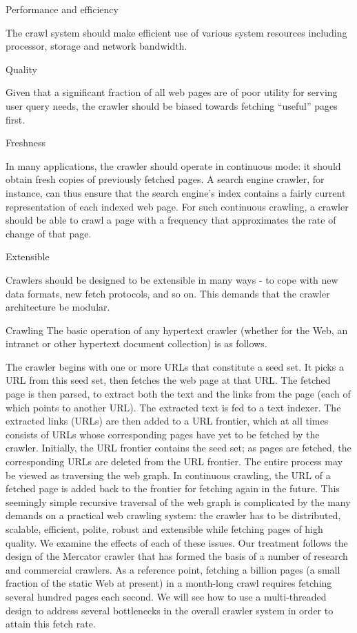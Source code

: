 {Performance and efficiency

The crawl system should make efficient use of various system resources including processor, storage and network bandwidth.

Quality

Given that a significant fraction of all web pages are of poor utility for serving user query needs, the crawler should be biased towards fetching ``useful'' pages first.

Freshness

In many applications, the crawler should operate in continuous mode: it should obtain fresh copies of previously fetched pages. A search engine crawler, for instance, can thus ensure that the search engine's index contains a fairly current representation of each indexed web page. For such continuous crawling, a crawler should be able to crawl a page with a frequency that approximates the rate of change of that page.

Extensible

Crawlers should be designed to be extensible in many ways - to cope with new data formats, new fetch protocols, and so on. This demands that the crawler architecture be modular.

Crawling
The basic operation of any hypertext crawler (whether for the Web, an intranet or other hypertext document collection) is as follows.

The crawler begins with one or more URLs that constitute a seed set. It picks a URL from this seed set, then fetches the web page at that URL.
The fetched page is then parsed, to extract both the text and the links from the page (each of which points to another URL).
The extracted text is fed to a text indexer.
The extracted links (URLs) are then added to a URL frontier, which at all times consists of URLs whose corresponding pages have yet to be fetched by the crawler.
Initially, the URL frontier contains the seed set; as pages are fetched, the corresponding URLs are deleted from the URL frontier. The entire process may be viewed as traversing the web graph. In continuous crawling, the URL of a fetched page is added back to the frontier for fetching again in the future.
This seemingly simple recursive traversal of the web graph is complicated by the many demands on a practical web crawling system: the crawler has to be distributed, scalable, efficient, polite, robust and extensible while fetching pages of high quality. We examine the effects of each of these issues. Our treatment follows the design of the Mercator crawler that has formed the basis of a number of research and commercial crawlers. As a reference point, fetching a billion pages (a small fraction of the static Web at present) in a month-long crawl requires fetching several hundred pages each second. We will see how to use a multi-threaded design to address several bottlenecks in the overall crawler system in order to attain this fetch rate.

}
